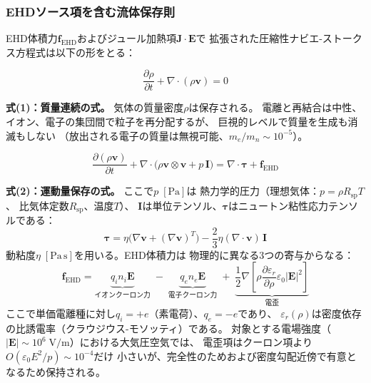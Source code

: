 \documentclass[12pt,twocolumn]{ltjsarticle}
\newcommand{\ee}{\mathbf{E}}
\newcommand{\jj}{\mathbf{J}}
\newcommand{\vv}{\mathbf{v}}
\newcommand{\ff}{\mathbf{f}}
\begin{document}
\subsubsection{EHDソース項を含む流体保存則}

EHD体積力$\ff_{\mathrm{EHD}}$およびジュール加熱項$\jj \cdot \ee$で
拡張された圧縮性ナビエ-ストークス方程式は以下の形をとる：

\begin{equation}
\boxed{
  \frac{\partial \rho}{\partial t}
  + \nabla \cdot (\rho \vv) = 0
}
\tag{1}
\label{eq:NS1}
\end{equation}

\noindent
\textbf{式(1)：質量連続の式。} 気体の質量密度$\rho$は保存される。
電離と再結合は中性、イオン、電子の集団間で粒子を再分配するが、
巨視的レベルで質量を生成も消滅もしない
（放出される電子の質量は無視可能、$m_e/m_n \sim 10^{-5}$）。

\begin{equation}
\boxed{
  \frac{\partial (\rho \vv)}{\partial t}
  + \nabla \cdot \bigl(\rho \vv \otimes \vv + p\,\mathbf{I}\bigr)
  = \nabla \cdot \bm{\tau} + \ff_{\mathrm{EHD}}
}
\tag{2}
\label{eq:NS2}
\end{equation}

\noindent
\textbf{式(2)：運動量保存の式。} ここで$p\;[\mathrm{Pa}]$は
熱力学的圧力（理想気体：$p = \rho R_{\mathrm{sp}} T$、
比気体定数$R_{\mathrm{sp}}$、温度$T$）、
$\mathbf{I}$は単位テンソル、$\bm{\tau}$はニュートン粘性応力テンソルである：
\begin{equation}
  \bm{\tau} = \eta\bigl(\nabla\vv + (\nabla\vv)^T\bigr)
  - \frac{2}{3}\eta(\nabla \cdot \vv)\,\mathbf{I}
  \label{eq:viscous_stress}
\end{equation}
動粘度$\eta\;[\mathrm{Pa\,s}]$を用いる。EHD体積力は
物理的に異なる3つの寄与からなる：
\begin{equation}
  \ff_{\mathrm{EHD}}
  = \underbrace{q_i n_i \ee}_{\text{イオンクーロン力}}
  \;-\; \underbrace{q_e n_e \ee}_{\text{電子クーロン力}}
  \;+\; \underbrace{\frac{1}{2}\nabla\!\left[
    \rho\frac{\partial\varepsilon_r}{\partial\rho}
    \varepsilon_0 |\ee|^2
  \right]}_{\text{電歪}}
  \label{eq:f_EHD}
\end{equation}
ここで単価電離種に対し$q_i = +e$（素電荷）、$q_e = -e$であり、
$\varepsilon_r(\rho)$は密度依存の比誘電率（クラウジウス-モソッティ）である。
対象とする電場強度（$|\ee| \sim 10^6\;\mathrm{V/m}$）における大気圧空気では、
電歪項はクーロン項より$O(\varepsilon_0 E^2 / p) \sim 10^{-4}$だけ
小さいが、完全性のためおよび密度勾配近傍で有意となるため保持される。
\end{document}
